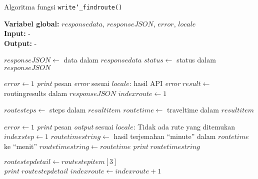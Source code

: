 \begin{algorithm}[h]
	\caption{Algoritma fungsi \texttt{write\char`_findroute()}}
	\label{alg:design-write-findroute}
	\vspace{-0.6\baselineskip}
	\begin{flushleft}
		\textbf{Variabel global:} $responsedata$, $responseJSON$, $error$, $locale$ \\
		\textbf{Input:} - \\
		\textbf{Output:} - \\
	\end{flushleft}
	\vspace{-1.05\baselineskip}
	\begin{algorithmic}
		\State $responseJSON \gets$ data dalam $responsedata$
		\State $status \gets$ \textquotesingle\textquotesingle status\textquotesingle\textquotesingle\xspace dalam $responseJSON$
		
			\State $error \gets 1$
			\State \textit{print} pesan \textit{error} sesuai $locale$: hasil API \textit{error}
		\Else
			\State $result \gets$ \textquotesingle\textquotesingle routingresults\textquotesingle\textquotesingle\xspace dalam $responseJSON$
			\State $indexroute \gets 1$
			
			 
				\State $routesteps \gets$ \textquotesingle\textquotesingle steps\textquotesingle\textquotesingle\xspace dalam $resultitem$
				\State $routetime \gets$ \textquotesingle\textquotesingle traveltime\textquotesingle\textquotesingle\xspace dalam $resultitem$
				
					\State $error \gets 1$
					\State \textit{print} pesan \textit{output} sesuai $locale$: Tidak ada rute yang ditemukan
				\Else
					\State $indexstep \gets 1$
					 
						\State $routetimestring \gets$ hasil terjemahan ``minute'' dalam $routetime$ ke ``menit''
					\Else
						\State $routetimestring \gets routetime$
					\EndIf
					\State \textit{print} $routetimestring$
					
					 
						\State $routestepdetail \gets routestepitem[3]$ \\ 
						\State \textit{print $routestepdetail$}
					\EndFor
				\EndIf
				\State $indexroute \gets indexroute + 1$
			\EndFor
		\EndIf
	\end{algorithmic}
\end{algorithm}

